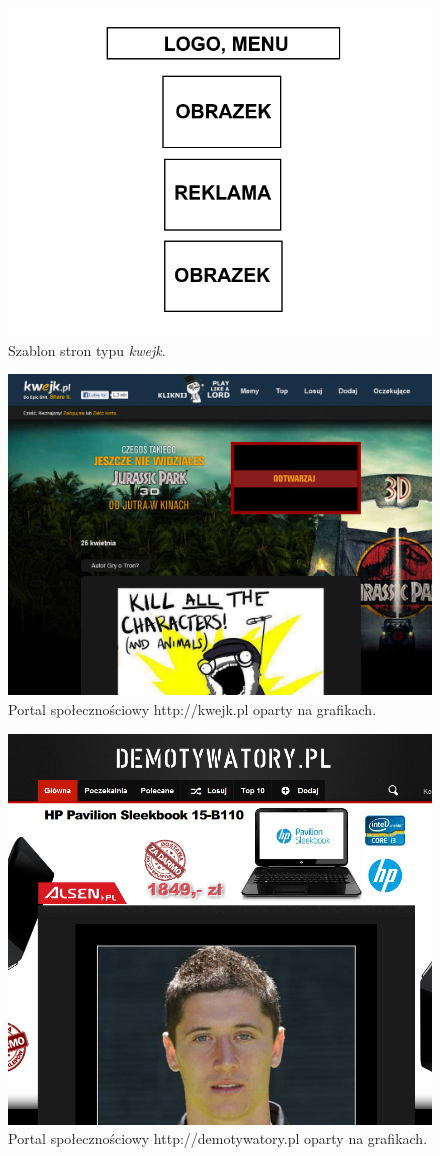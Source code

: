 \documentclass[a4paper,10pt]{article}
\begin{document}
\begin{figure}[h!]
\centering
  \includegraphics[width=.5\textwidth]{image_meme_template.png}
  \caption{Szablon stron typu \emph{kwejk}.}
  \label{fig:image_meme_template}
\end{figure}

\begin{figure}[h!]
\centering
  \includegraphics[width=.9\textwidth]{image_meme_kwejk.png}
  \caption{Portal społecznościowy http://kwejk.pl oparty na grafikach.}
  \label{fig:image_meme_kwejk}
\end{figure}

\begin{figure}[h!]
\centering
  \includegraphics[width=.9\textwidth]{image_meme_demotywatory.png}
  \caption{Portal społecznościowy http://demotywatory.pl oparty na grafikach.}
  \label{fig:image_meme_demotywatory}
\end{figure}
\end{document}
